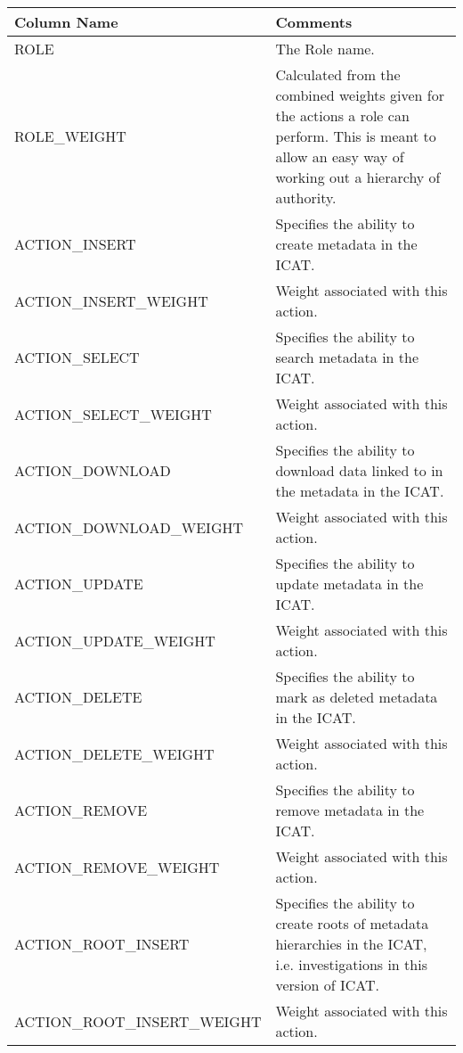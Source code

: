 \documentclass{report}
\begin{document}
\begin{tabular}{|l|l|}
\hline
Column Name & Comments \\ \hline
ROLE & \multicolumn{1}{p{100mm}|}{
The Role name.} \\ \hline
ROLE\_WEIGHT & \multicolumn{1}{p{100mm}|}{
Calculated from the combined weights given for the actions a role can perform. This is meant to allow an easy way of working out a hierarchy of authority.} \\ \hline
ACTION\_INSERT & \multicolumn{1}{p{100mm}|}{
Specifies the ability to create metadata in the ICAT.} \\ \hline
ACTION\_INSERT\_WEIGHT & \multicolumn{1}{p{100mm}|}{
Weight associated with this action.} \\ \hline
ACTION\_SELECT & \multicolumn{1}{p{100mm}|}{
Specifies the ability to search metadata in the ICAT.} \\ \hline
ACTION\_SELECT\_WEIGHT & \multicolumn{1}{p{100mm}|}{
Weight associated with this action.} \\ \hline
ACTION\_DOWNLOAD & \multicolumn{1}{p{100mm}|}{
Specifies the ability to download data linked to in the metadata in the ICAT.} \\ \hline
ACTION\_DOWNLOAD\_WEIGHT & \multicolumn{1}{p{100mm}|}{
Weight associated with this action.} \\ \hline
ACTION\_UPDATE & \multicolumn{1}{p{100mm}|}{
Specifies the ability to update metadata in the ICAT.} \\ \hline
ACTION\_UPDATE\_WEIGHT & \multicolumn{1}{p{100mm}|}{
Weight associated with this action.} \\ \hline
ACTION\_DELETE & \multicolumn{1}{p{100mm}|}{
Specifies the ability to mark as deleted metadata in the ICAT.} \\ \hline
ACTION\_DELETE\_WEIGHT & \multicolumn{1}{p{100mm}|}{
Weight associated with this action.} \\ \hline
ACTION\_REMOVE & \multicolumn{1}{p{100mm}|}{
Specifies the ability to remove metadata in the ICAT.} \\ \hline
ACTION\_REMOVE\_WEIGHT & \multicolumn{1}{p{100mm}|}{
Weight associated with this action.} \\ \hline
ACTION\_ROOT\_INSERT & \multicolumn{1}{p{100mm}|}{
Specifies the ability to create roots of metadata hierarchies in the ICAT, i.e. investigations in this version of ICAT.} \\ \hline
ACTION\_ROOT\_INSERT\_WEIGHT & \multicolumn{1}{p{100mm}|}{
Weight associated with this action.} \\ \hline

\end{tabular}
\end{document}
